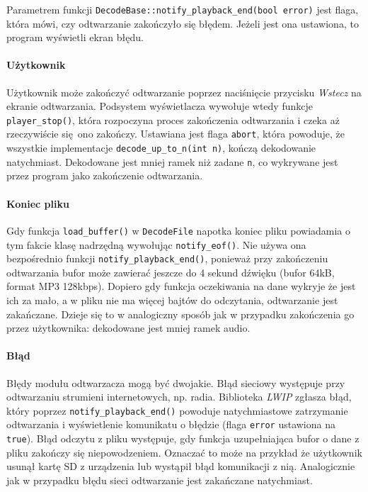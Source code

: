 \documentclass[12pt]{report}
\begin{document}
	Parametrem funkcji \lstinline|DecodeBase::notify_playback_end(bool error)| jest flaga, która mówi, czy odtwarzanie zakończyło się błędem. Jeżeli jest ona ustawiona, to program wyświetli ekran błędu.
	
	\paragraph{Użytkownik}
		Użytkownik może zakończyć odtwarzanie poprzez naciśnięcie przycisku \textit{Wstecz} na ekranie odtwarzania. Podsystem wyświetlacza wywołuje wtedy funkcje \lstinline|player_stop()|, która rozpoczyna proces zakończenia odtwarzania i czeka aż rzeczywiście się ono zakończy. Ustawiana jest flaga \lstinline|abort|, która powoduje, że wszystkie implementacje \lstinline|decode_up_to_n(int n)|, kończą dekodowanie natychmiast. Dekodowane jest mniej ramek niż zadane \lstinline|n|, co wykrywane jest przez program jako zakończenie odtwarzania.
	
	\paragraph{Koniec pliku}
		Gdy funkcja \lstinline|load_buffer()| w \lstinline|DecodeFile| napotka koniec pliku powiadamia o tym fakcie klasę nadrzędną wywołując \lstinline|notify_eof()|. Nie używa ona bezpośrednio funkcji \lstinline|notify_playback_end()|, ponieważ przy zakończeniu odtwarzania bufor może zawierać jeszcze do 4 sekund dźwięku (bufor 64kB, format MP3 128kbps). Dopiero gdy funkcja oczekiwania na dane wykryje że jest ich za mało, a w pliku nie ma więcej bajtów do odczytania, odtwarzanie jest zakańczane. Dzieje się to w analogiczny sposób jak w przypadku zakończenia go przez użytkownika: dekodowane jest mniej ramek audio.
	
	\paragraph{Błąd}
		Błędy modułu odtwarzacza mogą być dwojakie. Błąd sieciowy występuje przy odtwarzaniu strumieni internetowych, np. radia. Biblioteka \textit{LWIP} zgłasza błąd, który poprzez \lstinline|notify_playback_end()| powoduje natychmiastowe zatrzymanie odtwarzania i wyświetlenie komunikatu o błędzie (flaga \lstinline|error| ustawiona na \lstinline|true|). Błąd odczytu z pliku występuje, gdy funkcja uzupełniająca bufor o dane z pliku zakończy się niepowodzeniem. Oznaczać to może na przykład że użytkownik usunął kartę SD z urządzenia lub wystąpił błąd komunikacji z nią. Analogicznie jak w przypadku błędu sieci odtwarzanie jest zakańczane natychmiast.
		
\end{document}
